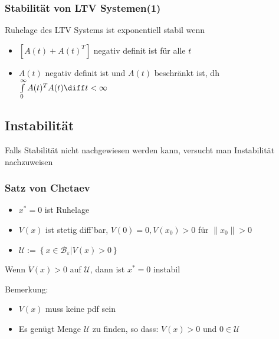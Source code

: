 \documentclass[german]{latex4ei/latex4ei_sheet}
\begin{document}
\begin{sectionbox}
\subsubsection{Stabilität von LTV Systemen(1)}
Ruhelage des LTV Systems ist exponentiell stabil wenn
\begin{itemize}
  \item $\left[ A(t) + A(t)^T \right]$ negativ definit ist für alle $t$
  \item $A(t)$ negativ definit ist und $A(t)$ beschränkt ist, dh $\int\limits_{0}^{\infty}A(t)^T A(t) \diff t < \infty$
\end{itemize}

\subsection{Instabilität}
Falls Stabilität nicht nachgewiesen werden kann, versucht man Instabilität nachzuweisen

\subsubsection{Satz von Chetaev}
\begin{itemize}
  \item $x^* = 0$ ist Ruhelage
  \item $V(x)$ ist stetig diff'bar, $V(0)=0, V(x_0)>0$ für $\|x_0\| > 0$
  \item $\mathcal{U} := \left\{ x \in \mathcal{B}_\varepsilon | V(x) > 0 \right\}$
\end{itemize}
Wenn $\dot{V}(x) > 0$ auf $\mathcal{U}$, dann ist $x^*=0$ instabil

Bemerkung:
\begin{itemize}
  \item $V(x)$ muss keine pdf sein
  \item Es genügt Menge $\mathcal{U}$ zu finden, so dass: $V(x) > 0$ und $0 \in \mathcal{U}$
\end{itemize}
\end{sectionbox}
\end{document}

